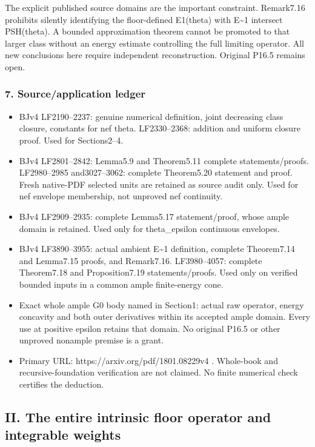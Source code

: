 \documentclass[
]{article}
\providecommand{\tightlist}{%
  \setlength{\itemsep}{0pt}\setlength{\parskip}{0pt}}
\begin{document}
The explicit published source domains are the important constraint.
Remark7.16 prohibits silently identifying the floor-defined E1(theta)
with E\textasciitilde1 intersect PSH(theta). A bounded approximation
theorem cannot be promoted to that larger class without an energy
estimate controlling the full limiting operator. All new conclusions
here require independent reconstruction. Original P16.5 remains open.

\subsubsection{7. Source/application
ledger}\label{sourceapplication-ledger}

\begin{itemize}
\tightlist
\item
  BJv4 LF2190--2237: genuine numerical definition, joint decreasing
  class closure, constants for nef theta. LF2330--2368: addition and
  uniform closure proof. Used for Sections2--4.
\item
  BJv4 LF2801--2842: Lemma5.9 and Theorem5.11 complete
  statements/proofs. LF2980--2985 and3027--3062: complete Theorem5.20
  statement and proof. Fresh native-PDF selected units are retained as
  source audit only. Used for nef envelope membership, not unproved nef
  continuity.
\item
  BJv4 LF2909--2935: complete Lemma5.17 statement/proof, whose ample
  domain is retained. Used only for theta\_epsilon continuous envelopes.
\item
  BJv4 LF3890--3955: actual ambient E\textasciitilde1 definition,
  complete Theorem7.14 and Lemma7.15 proofs, and Remark7.16.
  LF3980--4057: complete Theorem7.18 and Proposition7.19
  statements/proofs. Used only on verified bounded inputs in a common
  ample finite-energy cone.
\item
  Exact whole ample G0 body named in Section1: actual raw operator,
  energy concavity and both outer derivatives within its accepted ample
  domain. Every use at positive epsilon retains that domain. No original
  P16.5 or other unproved nonample premise is a grant.
\item
  Primary URL: https://arxiv.org/pdf/1801.08229v4 . Whole-book and
  recursive-foundation verification are not claimed. No finite numerical
  check certifies the deduction.
\end{itemize}

\subsection{II. The entire intrinsic floor operator and integrable
weights}\label{ii.-the-entire-intrinsic-floor-operator-and-integrable-weights}
\end{document}
